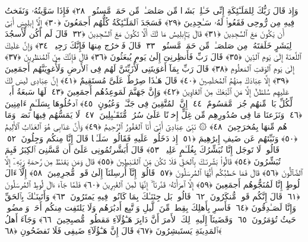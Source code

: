  وَإِذ قَالَ رَبُّكَ لِلمَلَـٰٓئِكَةِ إِنِّى خَـٰلِقٌۢ بَشَرًۭا مِّن صَلصَـٰلٍۢ مِّن حَمَإٍۢ مَّسنُونٍۢ ﴿٢٨﴾
 فَإِذَا سَوَّيتُهُۥ وَنَفَختُ فِيهِ مِن رُّوحِى فَقَعُوا۟ لَهُۥ سَـٰجِدِينَ ﴿٢٩﴾
 فَسَجَدَ ٱلمَلَـٰٓئِكَةُ كُلُّهُم أَجمَعُونَ ﴿٣٠﴾
 إِلَّآ إِبلِيسَ أَبَىٰٓ أَن يَكُونَ مَعَ ٱلسَّٰجِدِينَ ﴿٣١﴾
 قَالَ يَـٰٓإِبلِيسُ مَا لَكَ أَلَّا تَكُونَ مَعَ ٱلسَّٰجِدِينَ ﴿٣٢﴾
 قَالَ لَم أَكُن لِّأَسجُدَ لِبَشَرٍ خَلَقتَهُۥ مِن صَلصَـٰلٍۢ مِّن حَمَإٍۢ مَّسنُونٍۢ ﴿٣٣﴾
 قَالَ فَٱخرُج مِنهَا فَإِنَّكَ رَجِيمٌۭ ﴿٣٤﴾
 وَإِنَّ عَلَيكَ ٱللَّعنَةَ إِلَىٰ يَومِ ٱلدِّينِ ﴿٣٥﴾
 قَالَ رَبِّ فَأَنظِرنِىٓ إِلَىٰ يَومِ يُبعَثُونَ ﴿٣٦﴾
 قَالَ فَإِنَّكَ مِنَ ٱلمُنظَرِينَ ﴿٣٧﴾
 إِلَىٰ يَومِ ٱلوَقتِ ٱلمَعلُومِ ﴿٣٨﴾
 قَالَ رَبِّ بِمَآ أَغوَيتَنِى لَأُزَيِّنَنَّ لَهُم فِى ٱلأَرضِ وَلَأُغوِيَنَّهُم أَجمَعِينَ ﴿٣٩﴾
 إِلَّا عِبَادَكَ مِنهُمُ ٱلمُخلَصِينَ ﴿٤٠﴾
 قَالَ هَـٰذَا صِرَٰطٌ عَلَىَّ مُستَقِيمٌ ﴿٤١﴾
 إِنَّ عِبَادِى لَيسَ لَكَ عَلَيهِم سُلطَٰنٌ إِلَّا مَنِ ٱتَّبَعَكَ مِنَ ٱلغَاوِينَ ﴿٤٢﴾
 وَإِنَّ جَهَنَّمَ لَمَوعِدُهُم أَجمَعِينَ ﴿٤٣﴾
 لَهَا سَبعَةُ أَبوَٟبٍۢ لِّكُلِّ بَابٍۢ مِّنهُم جُزءٌۭ مَّقسُومٌ ﴿٤٤﴾
 إِنَّ ٱلمُتَّقِينَ فِى جَنَّـٰتٍۢ وَعُيُونٍ ﴿٤٥﴾
 ٱدخُلُوهَا بِسَلَـٰمٍ ءَامِنِينَ ﴿٤٦﴾
 وَنَزَعنَا مَا فِى صُدُورِهِم مِّن غِلٍّ إِخوَٟنًا عَلَىٰ سُرُرٍۢ مُّتَقَـٰبِلِينَ ﴿٤٧﴾
 لَا يَمَسُّهُم فِيهَا نَصَبٌۭ وَمَا هُم مِّنهَا بِمُخرَجِينَ ﴿٤٨﴾
 ۞ نَبِّئ عِبَادِىٓ أَنِّىٓ أَنَا ٱلغَفُورُ ٱلرَّحِيمُ ﴿٤٩﴾
 وَأَنَّ عَذَابِى هُوَ ٱلعَذَابُ ٱلأَلِيمُ ﴿٥٠﴾
 وَنَبِّئهُم عَن ضَيفِ إِبرَٰهِيمَ ﴿٥١﴾
 إِذ دَخَلُوا۟ عَلَيهِ فَقَالُوا۟ سَلَـٰمًۭا قَالَ إِنَّا مِنكُم وَجِلُونَ ﴿٥٢﴾
 قَالُوا۟ لَا تَوجَل إِنَّا نُبَشِّرُكَ بِغُلَـٰمٍ عَلِيمٍۢ ﴿٥٣﴾
 قَالَ أَبَشَّرتُمُونِى عَلَىٰٓ أَن مَّسَّنِىَ ٱلكِبَرُ فَبِمَ تُبَشِّرُونَ ﴿٥٤﴾
 قَالُوا۟ بَشَّرنَـٰكَ بِٱلحَقِّ فَلَا تَكُن مِّنَ ٱلقَـٰنِطِينَ ﴿٥٥﴾
 قَالَ وَمَن يَقنَطُ مِن رَّحمَةِ رَبِّهِۦٓ إِلَّا ٱلضَّآلُّونَ ﴿٥٦﴾
 قَالَ فَمَا خَطبُكُم أَيُّهَا ٱلمُرسَلُونَ ﴿٥٧﴾
 قَالُوٓا۟ إِنَّآ أُرسِلنَآ إِلَىٰ قَومٍۢ مُّجرِمِينَ ﴿٥٨﴾
 إِلَّآ ءَالَ لُوطٍ إِنَّا لَمُنَجُّوهُم أَجمَعِينَ ﴿٥٩﴾
 إِلَّا ٱمرَأَتَهُۥ قَدَّرنَآ ۙ إِنَّهَا لَمِنَ ٱلغَٰبِرِينَ ﴿٦٠﴾
 فَلَمَّا جَآءَ ءَالَ لُوطٍ ٱلمُرسَلُونَ ﴿٦١﴾
 قَالَ إِنَّكُم قَومٌۭ مُّنكَرُونَ ﴿٦٢﴾
 قَالُوا۟ بَل جِئنَـٰكَ بِمَا كَانُوا۟ فِيهِ يَمتَرُونَ ﴿٦٣﴾
 وَأَتَينَـٰكَ بِٱلحَقِّ وَإِنَّا لَصَـٰدِقُونَ ﴿٦٤﴾
 فَأَسرِ بِأَهلِكَ بِقِطعٍۢ مِّنَ ٱلَّيلِ وَٱتَّبِع أَدبَٰرَهُم وَلَا يَلتَفِت مِنكُم أَحَدٌۭ وَٱمضُوا۟ حَيثُ تُؤمَرُونَ ﴿٦٥﴾
 وَقَضَينَآ إِلَيهِ ذَٟلِكَ ٱلأَمرَ أَنَّ دَابِرَ هَـٰٓؤُلَآءِ مَقطُوعٌۭ مُّصبِحِينَ ﴿٦٦﴾
 وَجَآءَ أَهلُ ٱلمَدِينَةِ يَستَبشِرُونَ ﴿٦٧﴾
 قَالَ إِنَّ هَـٰٓؤُلَآءِ ضَيفِى فَلَا تَفضَحُونِ ﴿٦٨﴾
